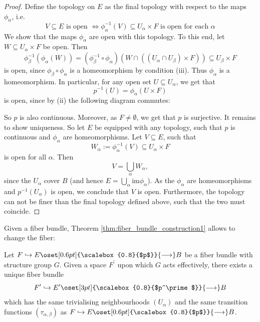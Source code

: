      \begin{proof}
        Define the topology on $E$ as the final topology with respect to the maps $\phi_\alpha$, i.e.
        \[
        V \subseteq E \text{ is open } \Leftrightarrow \phi_\alpha^{-1}(V) \subseteq U_\alpha \times F \text{ is open for each } \alpha
        \]
        We show that the maps $\phi_\alpha$ are open with this topology. To this end, let $W \subseteq U_\alpha \times F$ be open. Then
        \[
        \phi_\beta^{-1}(\phi_\alpha(W)) = (\phi_\beta^{-1} \circ \phi_\alpha)(W \cap ((U_\alpha \cap U_\beta) \times F)) \subseteq U_\beta \times F
        \]
        is open, since $\phi_\beta \circ \phi_\alpha$ is a homeomorphism by condition (iii). Thus $\phi_\alpha$ is a homeomorphism. In particular, for any open set $U \subseteq U_\alpha$, we get that
        \[
        p^{-1}(U) = \phi_\alpha(U \times F)
        \]
        is open, since by (ii) the following diagram commutes:
        \begin{center}
        \end{center}
        So $p$ is also continuous. Moreover, as $F \neq \emptyset$, we get that $p$ is surjective. It remains to show uniqueness. So let $E$ be equipped with any topology, such that $p$ is continuous and $\phi_\alpha$ are homeomorphisms. Let $V \subseteq E$, such that 
        \[
        W_\alpha := \phi_\alpha^{-1}(V) \subseteq U_\alpha \times F
        \]
        is open for all $\alpha$. Then 
        \[
        V = \bigcup_\alpha W_\alpha,
        \]
        since the $U_\alpha$ cover $B$ (and hence $E = \bigcup_\alpha \mathrm{im}\phi_\alpha$). As the $\phi_\alpha$ are homeomorphisms and $p^{-1}(U_\alpha)$ is open, we conclude that $V$ is open. Furthermore, the topology can not be finer than the final topology defined above, such that the two must coincide.
     \end{proof}

    Given a fiber bundle, Theorem \ref{thm:fiber_bundle_construction1} allows to change the fiber:

    \begin{corollary}
        Let $F \hookrightarrow E \oset[0.6pt]{\scalebox{0.8}{$p$}}{\longrightarrow} B$ be a fiber bundle with structure group $G$. Given a space $F^\prime$ upon which $G$ acts effectively, there exists a unique fiber bundle 
        \[
        F^\prime \hookrightarrow E^\prime \oset[3pt]{\scalebox{0.8}{$p^\prime$}}{\longrightarrow} B
        \]
        which has the same trivialising neighbourhoods $(U_\alpha)$ and the same transition functions $(\tau_{\alpha,\beta})$ as $F \hookrightarrow E \oset[0.6pt]{\scalebox{0.8}{$p$}}{\longrightarrow} B$.
    \end{corollary}

